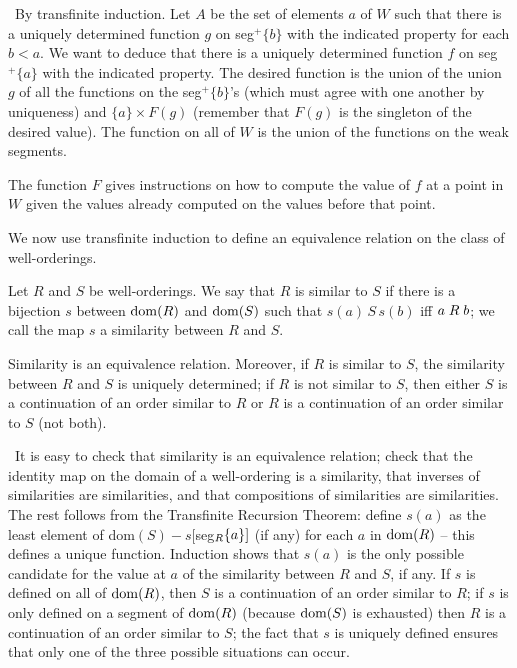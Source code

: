 \preuve\ By transfinite induction.  Let $A$ be the set of elements $a$ of $W$
such that there is a uniquely determined function $g$ on seg$^+\{b\}$
with the indicated property for each $b < a$.  We want to deduce that
there is a uniquely determined function $f$ on seg$^+\{a\}$
with the indicated property.  The desired function is the union of the union
$g$ of all the functions on the seg$^+\{b\}$'s (which must agree with
one another by uniqueness) and $\{a\} \times F(g)$ (remember that
$F(g)$ is the singleton of the desired value).  The function
on all of $W$ is the union of the functions on the weak segments.\linebreak
\finpreuve

The function $F$ gives instructions on how to compute the value
of $f$ at a point in $W$ given the values already computed on the values
before that point.

We now use transfinite induction to define an equivalence
relation on the class of
well-orderings.

\begin{definition}
 Let $R$ and $S$ be well-orderings.  We say that $R$ is
 {\upshape similar} to
 $S$ if there is a bijection $s$ between $\mathop{\mathrm{dom}}(R)$ and
 $\mathop{\mathrm{dom}}(S)$ such that $s(a)\, S\, s(b)$ iff $a \mathrel{R} b$; we call the map $s$ a
 {\upshape similarity} between $R$ and $S$.
\end{definition}

\begin{thm}
 Similarity is an equivalence relation.  Moreover, if $R$ is similar to $S$, the similarity between $R$ and
 $S$ is uniquely determined; if $R$ is not similar to $S$, then either $S$ is a
 continuation of an order similar to $R$ or $R$ is a continuation of an order
 similar to $S$ (not both).
\end{thm}

\preuve\ It is easy to check that similarity is an equivalence
relation; check that the identity map on the domain of a
well-ordering is a similarity, that
inverses of similarities are similarities, and that
compositions of similarities are similarities.  The rest
follows from the Transfinite Recursion Theorem: define $s(a)$ as the least
element of dom$(S) - s[$seg$_R\{a\}]\index{segment}$ (if any) for each $a$ in
$\mathop{\mathrm{dom}}(R)$ -- this defines a unique function.
Induction shows that $s(a)$ is the only possible
candidate for the value at $a$ of the 
similarity between $R$ and $S$, if any.  If $s$ is defined on all of
$\mathop{\mathrm{dom}}(R)$, then $S$ is a continuation of an order similar to $R$; if
$s$ is only defined on a segment of $\mathop{\mathrm{dom}}(R)$ (because $\mathop{\mathrm{dom}}(S)$ is
exhausted) then $R$ is a continuation of an order similar to $S$; the
fact that $s$ is uniquely defined ensures that only one of the three
possible situations can occur.
\finpreuve

